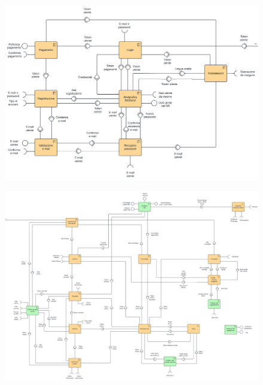 \documentclass[a4paper,12pt]{article}
\begin{document}
\begin{figure}[htp]
    \centering
    \includegraphics[width=\textwidth]{diagrams/component-1.png}
\end{figure}

\begin{figure}[htp]
    \centering
    \includegraphics[angle=90,width=\textwidth]{diagrams/component-2.png}
\end{figure}
\end{document}
